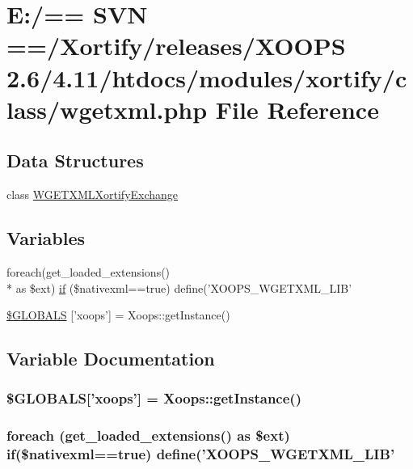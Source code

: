 \hypertarget{wgetxml_8php}{\section{E\-:/== S\-V\-N ==/\-Xortify/releases/\-X\-O\-O\-P\-S 2.6/4.11/htdocs/modules/xortify/class/wgetxml.php File Reference}
\label{wgetxml_8php}
}
\subsection*{Data Structures}
\begin{DoxyCompactItemize}
\item 
class \hyperlink{class_w_g_e_t_x_m_l_xortify_exchange}{W\-G\-E\-T\-X\-M\-L\-Xortify\-Exchange}
\end{DoxyCompactItemize}
\subsection*{Variables}
\begin{DoxyCompactItemize}
\item 
foreach(get\-\_\-loaded\-\_\-extensions() \\*
as \$ext) \hyperlink{wgetxml_8php_a121ad903444481b9834116cef5ea2f4d}{if} (\$nativexml==true) define('X\-O\-O\-P\-S\-\_\-\-W\-G\-E\-T\-X\-M\-L\-\_\-\-L\-I\-B'
\item 
\hyperlink{wgetxml_8php_ad10934112c0d18cf6b358d47afa6fcf1}{\$\-G\-L\-O\-B\-A\-L\-S} \mbox{[}'xoops'\mbox{]} = Xoops\-::get\-Instance()
\end{DoxyCompactItemize}


\subsection{Variable Documentation}
\hypertarget{wgetxml_8php_ad10934112c0d18cf6b358d47afa6fcf1}{
\subsubsection[{\$\-G\-L\-O\-B\-A\-L\-S}]{\setlength{\rightskip}{0pt plus 5cm}\$G\-L\-O\-B\-A\-L\-S\mbox{[}'xoops'\mbox{]} = Xoops\-::get\-Instance()}}\label{wgetxml_8php_ad10934112c0d18cf6b358d47afa6fcf1}
\hypertarget{wgetxml_8php_a121ad903444481b9834116cef5ea2f4d}{
\subsubsection[{if}]{\setlength{\rightskip}{0pt plus 5cm}foreach (get\-\_\-loaded\-\_\-extensions() as \$ext) if(\$nativexml==true) define('X\-O\-O\-P\-S\-\_\-\-W\-G\-E\-T\-X\-M\-L\-\_\-\-L\-I\-B'}}\label{wgetxml_8php_a121ad903444481b9834116cef5ea2f4d}
